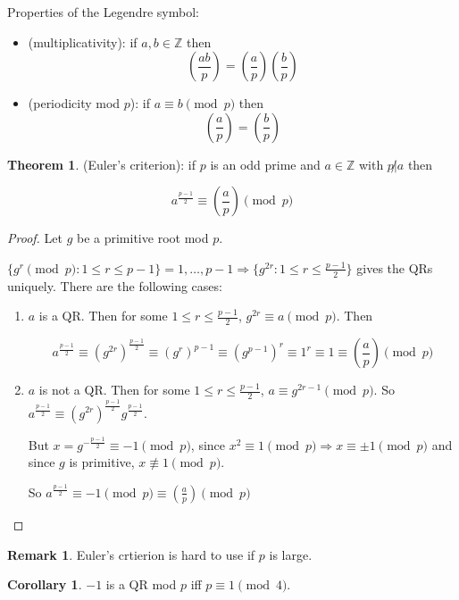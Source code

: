 \documentclass[12pt,a4paper]{article}
\theoremstyle{definition}
\newtheorem{theorem}[definition]{Theorem}
\newtheorem{corollary}[definition]{Corollary}
\newtheorem*{remark}{Remark}
\begin{document}
Properties of the Legendre symbol:
\begin{itemize}
	\item (multiplicativity): if $a, b \in \mathbb{Z}$ then
	\[(\frac{ab}{p}) = (\frac{a}{p})(\frac{b}{p})\]
	\item (periodicity mod $p$): if $a \equiv b \pmod{p}$ then
	\[(\frac{a}{p}) = (\frac{b}{p})\]
\end{itemize}

\begin{theorem}
	(Euler's criterion): if $p$ is an odd prime and $a \in \mathbb{Z}$ with $p \not | a$ then

	\[a^{\frac{p - 1}{2}} \equiv (\frac{a}{p}) \pmod{p}\]
\end{theorem}

\begin{proof}
	Let $g$ be a primitive root mod $p$.
	
	$\{g^r \pmod{p}: 1 \le r \le p - 1\} = {1, \dots, p - 1} \Rightarrow \{g^{2r}: 1 \le r \le \frac{p - 1}{2}\}$ gives the QRs uniquely. There are the following cases:

	\begin{enumerate}
		\item $a$ is a QR. Then for some $1 \le r \le \frac{p - 1}{2}$, $g^{2r} \equiv a \pmod{p}$. Then
		
		\[a^{\frac{p - 1}{2}} \equiv (g^{2r})^{\frac{p - 1}{2}} \equiv (g^r)^{p - 1} \equiv (g^{p - 1})^r \equiv 1^r \equiv 1 \equiv (\frac{a}{p}) \pmod{p}\]
		\item $a$ is not a QR. Then for some $1 \le r \le \frac{p - 1}{2}$, $a \equiv g^{2r - 1} \pmod{p}$. So $a^{\frac{p - 1}{2}} \equiv (g^{2r})^{\frac{p - 1}{2}} g^{\frac{p - 1}{2}}$.
		
		But $x = g^{-\frac{p - 1}{2}} \equiv -1 \pmod{p}$, since $x^2 \equiv 1 \pmod{p} \Rightarrow x \equiv \pm 1 \pmod{p}$ and since $g$ is primitive, $x \not\equiv 1 \pmod{p}$.

		So $a^{\frac{p - 1}{2}} \equiv -1 \pmod{p} \equiv (\frac{a}{p}) \pmod{p}$
	\end{enumerate}
\end{proof}

\begin{remark}
	Euler's crtierion is hard to use if $p$ is large.
\end{remark}

\begin{corollary}
	$-1$ is a QR mod $p$ iff $p \equiv 1 \pmod{4}$.
\end{corollary}
\end{document}
